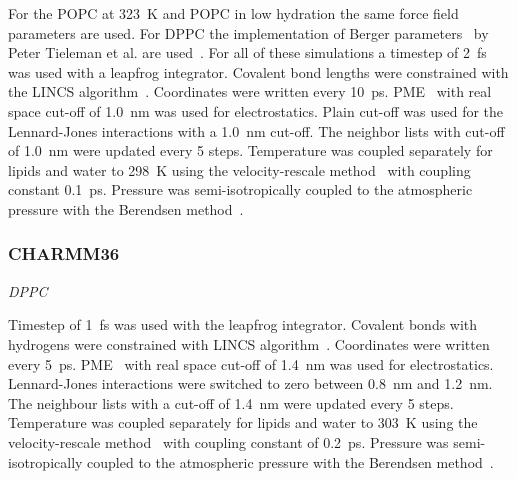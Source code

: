 \documentclass[pre,aps,floatfix,authordate1-4,twocolumn]{revtex4-1}
\begin{document}
For the POPC at 323~K and POPC in low hydration the same force field parameters are used.
For DPPC the implementation of Berger parameters~\cite{berger97} by Peter Tieleman et al. are used~\cite{marrink98}.
For all of these simulations a timestep of 2~fs was used with a leapfrog integrator. Covalent bond lengths were constrained with the LINCS algorithm~\cite{hess97,hess07}. 
Coordinates were written every 10~ps. PME~\cite{darden93,essman95} with real space cut-off of 1.0~nm was used 
for electrostatics. Plain cut-off was used for the Lennard-Jones interactions with a 1.0~nm cut-off.
The neighbor lists with cut-off of 1.0~nm were updated every 5 steps. Temperature was coupled separately
for lipids and water to 298~K using the velocity-rescale method~\cite{bussi07} with coupling constant 0.1~ps.
Pressure was semi-isotropically coupled to the atmospheric pressure with the Berendsen method~\cite{berendsen84}.


\subsubsection{CHARMM36}

{\it DPPC}

Timestep of 1~fs was used with the leapfrog integrator. Covalent bonds with hydrogens were constrained with LINCS algorithm~\cite{hess97,hess07}. 
Coordinates were written every 5~ps. PME~\cite{darden93,essman95} with real space cut-off of 1.4~nm was used 
for electrostatics. Lennard-Jones interactions were switched to zero between 0.8~nm and 1.2~nm.
The neighbour lists with a cut-off of 1.4~nm were updated every 5 steps. Temperature was coupled separately
for lipids and water to 303~K using the velocity-rescale method~\cite{bussi07} with coupling constant of 0.2~ps.
Pressure was semi-isotropically coupled to the atmospheric pressure with the Berendsen method~\cite{berendsen84}.
\end{document}
